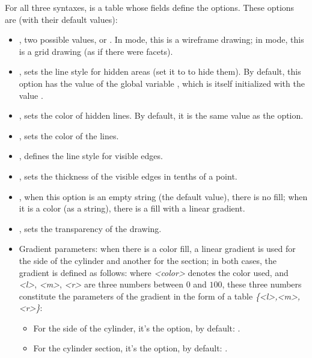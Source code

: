 For all three syntaxes,  is a table whose fields define the options. These options are (with their default values):
\begin{itemize}
    \item {}, two possible values,  or . In  mode, this is a wireframe drawing; in  mode, this is a grid drawing (as if there were facets).

    \item {}, sets the line style for hidden areas (set it to  to hide them). By default, this option has the value of the global variable , which is itself initialized with the value .

    \item  {}, sets the color of hidden lines. By default, it is the same value as the  option.

    \item {}, sets the color of the lines.
    
    \item {}, defines the line style for visible edges.

    \item {}, sets the thickness of the visible edges in tenths of a point.    

    \item {}, when this option is an empty string (the default value), there is no fill; when it is a color (as a string), there is a fill with a linear gradient.

    \item {}, sets the transparency of the drawing.

    \item Gradient parameters: when there is a color fill, a linear gradient is used for the side of the cylinder and another for the section; in both cases, the gradient is defined as follows:
where \emph{<color>} denotes the color used, and \emph{<l>}, \emph{<m>}, \emph{<r>} are three numbers between $0$ and $100$, these three numbers constitute the parameters of the gradient in the form of a table \emph{\{<l>,<m>,<r>\}}:
        \begin{itemize}
            \item For the side of the cylinder, it's the  option, by default: .
            \item For the cylinder section, it's the  option, by default: .
        \end{itemize}
\end{itemize}


